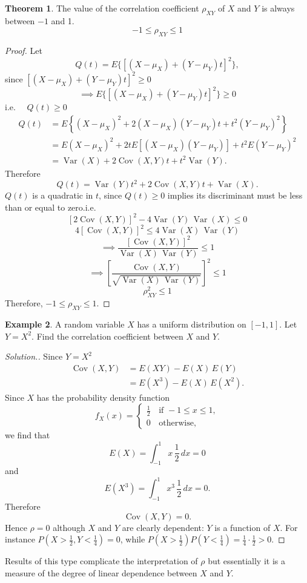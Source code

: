 \documentclass[12pt,a4paper]{report}
\theoremstyle{definition}
\newtheorem{thm}{Theorem}[section]
\newtheorem{example}[thm]{Example}
\theoremstyle{plain}
\theoremstyle{definition}
\begin{document}
\begin{thm}
The value of the correlation coefficient $\rho_{XY}$ of $X$ and $Y$ is always between $-1$ and 1. \[-1\leq \rho_{XY} \leq 1\]
\end{thm}

\begin{proof}
Let \[Q(t)=E\{[(X-\mu_X) + (Y-\mu_Y)t]^2\},\] since $[(X-\mu_X) + (Y-\mu_Y)t]^2\geq 0$
\[\implies E\{[(X-\mu_X)+(Y-\mu_Y)t]^2\}\geq 0\] 
i.e. $\quad Q(t)\geq 0$
\begin{align*}
Q(t) & = E\left\{\left(X-\mu_X\right)^2+2\left(X-\mu_X\right)\left(Y-\mu_Y\right)t+t^2\left(Y-\mu_Y\right)^2\right\}\\
     & = E\left(X-\mu_X\right)^2+2tE\left[\left(X-\mu_X\right)\left(Y-\mu_Y\right)\right]+t^2E\left(Y-\mu_Y\right)^2\\
     & = \operatorname{Var}(X)+2\operatorname{Cov}(X,Y)t+t^2\operatorname{Var}(Y).
\end{align*}
Therefore
\[Q(t)= \operatorname{Var}(Y)t^2+2\operatorname{Cov}(X,Y)t + \operatorname{Var}(X).\]
$Q(t)$ is a quadratic in $t$, since $Q(t)\geq 0$ implies its discriminant must be less than or equal to zero.i.e.
\[\left[2\operatorname{Cov}(X,Y)\right]^2-4\operatorname{Var}(Y)\,\operatorname{Var}(X)\leq 0\]
\[4\left[\operatorname{Cov}(X,Y)\right]^2\leq 4\operatorname{Var}(X)\,\operatorname{Var}(Y)\]
\[\implies \frac{\left[\operatorname{Cov}(X,Y)\right]^2}{\operatorname{Var}(X)\,\operatorname{Var}(Y)}\leq 1\]
\[\implies \left[\frac{\operatorname{Cov}(X,Y)}{\sqrt{\operatorname{Var}(X)\,\operatorname{Var}(Y)}}\right]^2\leq 1\]
\[\rho^2_{XY}\leq 1\]
Therefore, $-1\leq \rho_{XY}\leq 1$.
\end{proof}



\begin{example}
\label{ex:uncorrelateddependent}
A random variable $X$ has a uniform distribution on $[-1,1]$. Let $Y = X^2$. Find the correlation coefficient between $X$ and $Y$.
\end{example}
\begin{proof}[\textit{Solution.}]
Since  $Y = X^2$
\begin{align*}
\operatorname{Cov}(X,Y) & = E(XY) - E(X)\, E(Y)\\
& = E(X^3) - E(X)\, E(X^2).
\end{align*}
Since $X$ has the probability density function 
\[f_X(x) = \begin{cases}
\frac{1}{2}\, & \text{if}\,\, -1\leq x\leq 1,\\
0 & \text{otherwise},
\end{cases}\]
we find that \[E(X) = \int^1_{-1}x\, \frac{1}{2}\, dx = 0\]
and \[E(X^3) = \int^1_{-1}x^3\, \frac{1}{2}\, dx = 0.\]
Therefore \[\operatorname{Cov}(X,Y) = 0.\]
Hence $\rho = 0$ although $X$ and $Y$ are clearly dependent: $Y$ is a function of $X$. For instance $P(X>\frac12, Y<\frac14) = 0$, while $P(X>\frac12)P(Y<\frac14) = \frac14\cdot\frac12>0$. 
\end{proof}
Results of this type complicate the interpretation of $\rho$ but essentially it is a measure of the degree of linear dependence between $X$ and $Y$.
\end{document}

